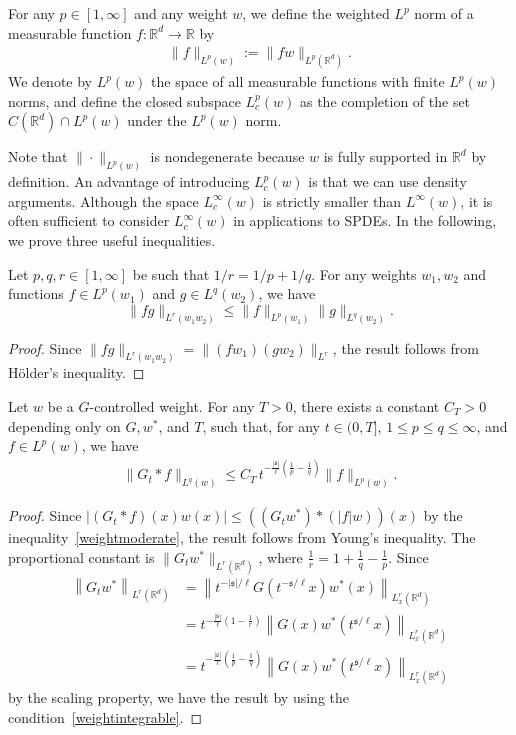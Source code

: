 \documentclass[AHL,Unicode,longabstracts,published]{cedram}
\newcommand{\bbR}{\mathbb{R}}
\newcommand{\mfs}{\mathfrak{s}}
\newcommand{\wco}{w^*}
\begin{document}
\begin{defi}
For any $p\in[1,\infty]$ and any weight $w$, we define the weighted $L^p$ norm of a measurable function $f:\bbR^d\to\bbR$ by
\begin{align*}
\|f\|_{L^p(w)}:=\|fw\|_{L^p(\bbR^d)}.
\end{align*}
We denote by $L^p(w)$ the space of all measurable functions with finite $L^p(w)$ norms, and define the closed subspace $L_c^p(w)$ as the completion of the set $C(\bbR^d)\cap L^p(w)$ under the $L^p(w)$ norm.
\end{defi}

Note that $\|\cdot\|_{L^p(w)}$ is nondegenerate because $w$ is fully supported in $\bbR^d$ by definition. An advantage of introducing $L_c^p(w)$ is that we can use density arguments. Although the space $L_c^\infty(w)$ is strictly smaller than $L^\infty(w)$, it is often sufficient to consider $L_c^\infty(w)$ in applications to SPDEs. In the following, we prove three useful inequalities.

\begin{lemm}\label{lem:weightedholder}
Let $p,q,r\in[1,\infty]$ be such that $1/r=1/p+1/q$. For any weights $w_1,w_2$ and functions $f\in L^p(w_1)$ and $g\in L^q(w_2)$, we have
\[
\|fg\|_{L^r(w_1w_2)}\le\|f\|_{L^p(w_1)}\|g\|_{L^q(w_2)}.
\]
\end{lemm}

\begin{proof}
Since $\|fg\|_{L^r(w_1w_2)}=\|(fw_1)(gw_2)\|_{L^r}$, the result follows from H\"older's inequality.
\end{proof}

\begin{lemm}[{\cite[Theorem~2.4]{MW17}}]\label{lem:weightedyoung}
Let $w$ be a $G$-controlled weight. For any $T>0$, there exists a constant $C_T>0$ depending only on $G,\wco$, and $T$, such that, for any $t\in(0,T]$, $1\le p\le q\le\infty$, and $f\in L^p(w)$, we have
\begin{align*}
\|G_t*f\|_{L^q(w)}\le C_T\,t^{-\frac{|\mfs|}\ell\left(\frac1p-\frac1q\right)}\|f\|_{L^p(w)}.
\end{align*}
\end{lemm}

\begin{proof}
Since $|(G_t*f)(x)w(x)|\le((G_t\wco)*(|f|w))(x)$ by the inequality~\eqref{weightmoderate}, the result follows from Young's inequality. The proportional constant is $\|G_t\wco\|_{L^r(\bbR^d)}$, where $\frac1r=1+\frac1q-\frac1p$. Since
\begin{align*}
\left\|G_t\wco\right\|_{L^r(\bbR^d)}&=\left\|t^{-|\mfs|/\ell}G\left(t^{-\mfs/\ell}x\right)\wco(x)\right\|_{L_x^r(\bbR^d)}\\
&=t^{-\frac{|\mfs|}\ell\left(1-\frac1r\right)}\left\|G(x)\wco\left(t^{\mfs/\ell}x\right)\right\|_{L_x^r(\bbR^d)}\\
& =t^{-\frac{|\mfs|}\ell\left(\frac1p-\frac1q\right)}\left\|G(x)\wco\left(t^{\mfs/\ell}x\right)\right\|_{L_x^r(\bbR^d)}
\end{align*}
by the scaling property, we have the result by using the condition~\eqref{weightintegrable}.
\end{proof}
\end{document}

